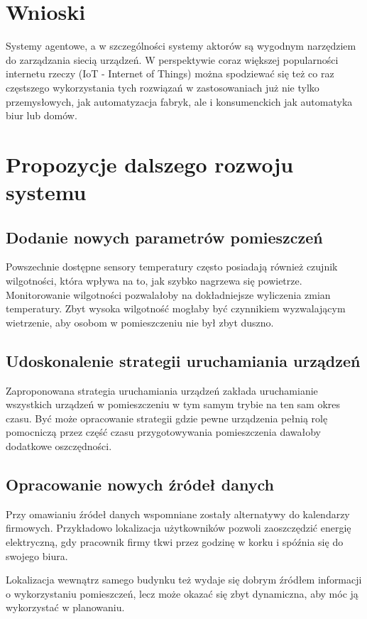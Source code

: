 \section{Wnioski}
Systemy agentowe, a w szczególności systemy aktorów są wygodnym narzędziem do zarządzania siecią urządzeń. 
W perspektywie coraz większej popularności internetu rzeczy (IoT - Internet of Things) można spodziewać się też co raz częstszego wykorzystania tych rozwiązań w zastosowaniach już nie tylko przemysłowych, jak automatyzacja fabryk, ale i konsumenckich jak automatyka biur lub domów.  

\section{Propozycje dalszego rozwoju systemu}
\subsection*{Dodanie nowych parametrów pomieszczeń}
Powszechnie dostępne sensory temperatury często posiadają również czujnik wilgotności, która wpływa na to, jak szybko nagrzewa się powietrze. Monitorowanie wilgotności pozwalałoby na dokładniejsze wyliczenia zmian temperatury. Zbyt wysoka wilgotność mogłaby być czynnikiem wyzwalającym wietrzenie, aby osobom w pomieszczeniu nie był zbyt duszno.

\subsection*{Udoskonalenie strategii uruchamiania urządzeń}
Zaproponowana strategia uruchamiania urządzeń zakłada uruchamianie wszystkich urządzeń w pomieszczeniu w tym samym trybie na ten sam okres czasu. Być może opracowanie strategii gdzie pewne urządzenia pełnią rolę pomocniczą przez część czasu przygotowywania pomieszczenia dawałoby dodatkowe oszczędności.

\subsection*{Opracowanie nowych źródeł danych}
Przy omawianiu źródeł danych wspomniane zostały alternatywy do kalendarzy firmowych. Przykładowo lokalizacja użytkowników pozwoli zaoszczędzić energię elektryczną, gdy pracownik firmy tkwi przez godzinę w korku i spóźnia się do swojego biura. 

Lokalizacja wewnątrz samego budynku też wydaje się dobrym źródłem informacji o wykorzystaniu pomieszczeń, lecz może okazać się zbyt dynamiczna, aby móc ją wykorzystać w planowaniu.

